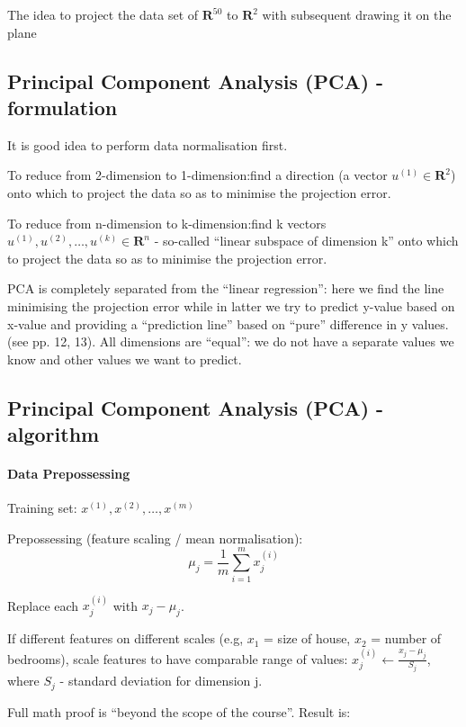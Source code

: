 \documentclass{scrartcl}
\begin{document}
The idea to project the data set of $\mathbf{R}^{50}$ to
$\mathbf{R}^{2}$ with subsequent drawing it on the plane

\subsection{Principal Component Analysis (PCA) - formulation}
\label{sec:14-3}
It is good idea to perform data normalisation first.

To reduce from 2-dimension to 1-dimension:find a direction (a vector
$u^{(1)} \in \mathbf{R}^2$) onto which to project the data so as to
minimise the projection error.

To reduce from n-dimension to k-dimension:find k vectors $u^{(1)},
u^{(2)}, \dots, u^{(k)} \in \mathbf{R}^n$ - so-called ``linear
subspace of dimension k'' onto which to project the data so as to
minimise the projection error.

PCA is completely separated from the ``linear regression'': here we
find the line minimising the projection error while in latter we try
to predict y-value based on x-value and providing a ``prediction
line'' based on ``pure'' difference in y values. (see pp. 12, 13). All
dimensions are ``equal'': we do not have a separate values we know and
other values we want to predict.

\subsection{Principal Component Analysis (PCA) - algorithm}
\label{sec:14-4}

\paragraph{Data Prepossessing}

Training set: $x^{(1)}, x^{(2)}, \dots, x^{(m)}$

Prepossessing (feature scaling / mean normalisation):
\[ \mu_j = \frac{1}{m} \sum \limits_{i=1}^{m} x_j^{(i)} \]

Replace each $x_j^{(i)}$ with $x_j - \mu_j$.

If different features on different scales (e.g, $x_1$ = size of house,
$x_2$ = number of bedrooms), scale features to have comparable range
of values: $ x_j^{(i)} \gets \frac{x_j - \mu_j}{S_j}$, where $S_j$ -
standard deviation for dimension j.

Full math proof is ``beyond the scope of the course''. Result is:
\end{document}

